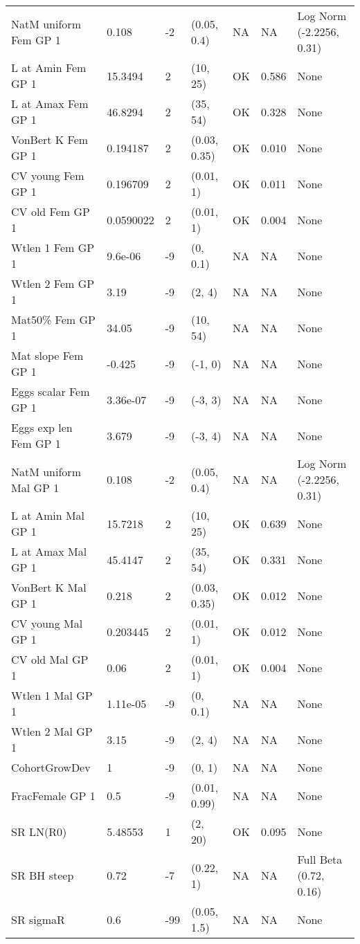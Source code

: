 \documentclass[11pt,
  english,
  letterpaper,
]{article}
\begin{document}
\begin{landscape}
\begin{longtable}[t]{>{\raggedright\arraybackslash}p{7.5cm}lllll>{\raggedright\arraybackslash}p{3.5cm}}
\endfoot
\bottomrule
\endlastfoot
NatM uniform Fem GP 1 & 0.108 & -2 & (0.05, 0.4) & NA & NA & Log Norm (-2.2256, 0.31)\\
L at Amin Fem GP 1 & 15.3494 & 2 & (10, 25) & OK & 0.586 & None\\
L at Amax Fem GP 1 & 46.8294 & 2 & (35, 54) & OK & 0.328 & None\\
VonBert K Fem GP 1 & 0.194187 & 2 & (0.03, 0.35) & OK & 0.010 & None\\
CV young Fem GP 1 & 0.196709 & 2 & (0.01, 1) & OK & 0.011 & None\\
CV old Fem GP 1 & 0.0590022 & 2 & (0.01, 1) & OK & 0.004 & None\\
Wtlen 1 Fem GP 1 & 9.6e-06 & -9 & (0, 0.1) & NA & NA & None\\
Wtlen 2 Fem GP 1 & 3.19 & -9 & (2, 4) & NA & NA & None\\
Mat50\% Fem GP 1 & 34.05 & -9 & (10, 54) & NA & NA & None\\
Mat slope Fem GP 1 & -0.425 & -9 & (-1, 0) & NA & NA & None\\
Eggs scalar Fem GP 1 & 3.36e-07 & -9 & (-3, 3) & NA & NA & None\\
Eggs exp len Fem GP 1 & 3.679 & -9 & (-3, 4) & NA & NA & None\\
NatM uniform Mal GP 1 & 0.108 & -2 & (0.05, 0.4) & NA & NA & Log Norm (-2.2256, 0.31)\\
L at Amin Mal GP 1 & 15.7218 & 2 & (10, 25) & OK & 0.639 & None\\
L at Amax Mal GP 1 & 45.4147 & 2 & (35, 54) & OK & 0.331 & None\\
VonBert K Mal GP 1 & 0.218 & 2 & (0.03, 0.35) & OK & 0.012 & None\\
CV young Mal GP 1 & 0.203445 & 2 & (0.01, 1) & OK & 0.012 & None\\
CV old Mal GP 1 & 0.06 & 2 & (0.01, 1) & OK & 0.004 & None\\
Wtlen 1 Mal GP 1 & 1.11e-05 & -9 & (0, 0.1) & NA & NA & None\\
Wtlen 2 Mal GP 1 & 3.15 & -9 & (2, 4) & NA & NA & None\\
CohortGrowDev & 1 & -9 & (0, 1) & NA & NA & None\\
FracFemale GP 1 & 0.5 & -9 & (0.01, 0.99) & NA & NA & None\\
SR LN(R0) & 5.48553 & 1 & (2, 20) & OK & 0.095 & None\\
SR BH steep & 0.72 & -7 & (0.22, 1) & NA & NA & Full Beta (0.72, 0.16)\\
SR sigmaR & 0.6 & -99 & (0.05, 1.5) & NA & NA & None\\

\end{longtable}
\end{landscape}
\end{document}
